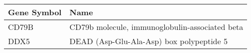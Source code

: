 \begin{tabular}{ll}
\toprule
Gene Symbol &                                           Name \\
\midrule
      CD79B & CD79b molecule, immunoglobulin-associated beta \\
       DDX5 &       DEAD (Asp-Glu-Ala-Asp) box polypeptide 5 \\
\bottomrule
\end{tabular}
